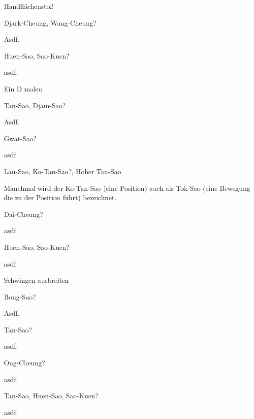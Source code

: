 
\begin{WTSatz}{Handfl\"achensto{\ss}}%
	\begin{WTSatzTeil}{Djark-Cheung, Wang-Cheung}{?}
		
		Asdf.
	\end{WTSatzTeil}
	\begin{WTSatzTeil}{Huen-Sao, Sao-Kuen}{?}
		
		asdf.
	\end{WTSatzTeil}
\end{WTSatz}



\begin{WTSatz}{Ein D malen}%
	\begin{WTSatzTeil}{Tan-Sao, Djam-Sao}{?}
		
		Asdf.
	\end{WTSatzTeil}
	\begin{WTSatzTeil}{Gwat-Sao}{?}
		
		asdf.
	\end{WTSatzTeil}
	\begin{WTSatzTeil}{Lau-Sao, Ko-Tan-Sao}{?, Hoher Tan-Sao}
		
		Manchmal wird der Ko-Tan-Sao (eine Position) auch als Tok-Sao (eine Bewegung die zu der Position f\"uhrt) bezeichnet.
	\end{WTSatzTeil}
	\begin{WTSatzTeil}{Dai-Cheung}{?}
		
		asdf.
	\end{WTSatzTeil}
	\begin{WTSatzTeil}{Huen-Sao, Sao-Kuen}{?}
		
		asdf.
	\end{WTSatzTeil}
\end{WTSatz}


\begin{WTSatz}{Schwingen ausbreiten}%
	\begin{WTSatzTeil}{Bong-Sao}{?}
		
		Asdf.
	\end{WTSatzTeil}
	\begin{WTSatzTeil}{Tan-Sao}{?}
		
		asdf.
	\end{WTSatzTeil}
	\begin{WTSatzTeil}{Ong-Cheung}{?}
		
		asdf.
	\end{WTSatzTeil}
	\begin{WTSatzTeil}{Tan-Sao, Huen-Sao, Sao-Kuen}{?}
		
		asdf.
	\end{WTSatzTeil}
\end{WTSatz}

